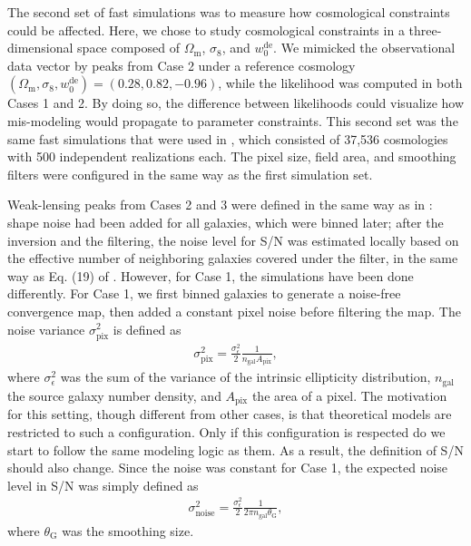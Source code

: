 \documentclass{aa} %
\newcommand{\OmegaM}{\Omega_\mathrm{m}}
\newcommand{\sigEig}{\sigma_8}
\newcommand{\wZero}{w_0^\mathrm{de}}
\newcommand{\gala}{\mathrm{gal}}
\newcommand{\noise}{\mathrm{noise}}
\newcommand{\pix}{\mathrm{pix}}
\newcommand{\rmG}{\mathrm{G}}   \newcommand{\rmT}{\mathrm{T}}
\newcommand{\PaperIII}{\citetalias{Lin_etal_2016a}}
\begin{document}
The second set of fast simulations was to measure how cosmological constraints could be affected. Here, we chose to study cosmological constraints in a three-dimensional space composed of $\OmegaM$, $\sigEig$, and $\wZero$. We mimicked the observational data vector by peaks from Case 2 under a reference cosmology $(\OmegaM, \sigEig, \wZero) = (0.28, 0.82, -0.96)$, while the likelihood was computed in both Cases 1 and 2. By doing so, the difference between likelihoods could visualize how mis-modeling would propagate to parameter constraints. This second set was the same fast simulations that were used in \PaperIII, which consisted of 37,536 cosmologies with 500 independent realizations each. The pixel size, field area, and smoothing filters were configured in the same way as the first simulation set.

Weak-lensing peaks from Cases 2 and 3 were defined in the same way as in \PaperIII: shape noise had been added for all galaxies, which were binned later; after the inversion and the filtering, the noise level for S/N was estimated locally based on the effective number of neighboring galaxies covered under the filter, in the same way as Eq. (19) of \PaperIII. However, for Case 1, the simulations have been done differently. For Case 1, we first binned galaxies to generate a noise-free convergence map, then added a constant pixel noise before filtering the map. The noise variance $\sigma_\pix^2$ is defined as
\begin{align}
        \sigma_\pix^2 = \frac{\sigma_\epsilon^2}{2} \frac{1}{n_\gala A_\pix},
\end{align}
where $\sigma_\epsilon^2$ was the sum of the variance of the intrinsic ellipticity distribution, $n_\gala$ the source galaxy number density, and $A_\pix$ the area of a pixel. The motivation for this setting, though different from other cases, is that theoretical models are restricted to such a configuration. Only if this configuration is respected do we start to follow the same modeling logic as them. As a result, the definition of S/N should also change. Since the noise was constant for Case 1, the expected noise level in S/N was simply defined as 
\begin{align}
        \sigma_\noise^2 = \frac{\sigma_\epsilon^2}{2} \frac{1}{2\pi n_\gala \theta_\rmG},
\end{align}
where $\theta_\rmG$ was the smoothing size.
\end{document}
